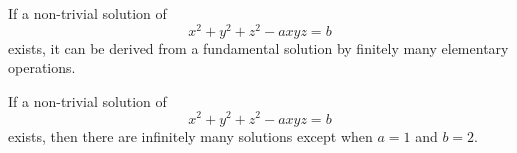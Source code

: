 \begin{proposition}
    If a non-trivial solution of
\[
    x^2+y^2+z^2-axyz=b
\]
    exists, it can be derived from a fundamental solution by finitely many elementary operations.
\end{proposition}

\begin{proposition}
    If a non-trivial solution of
\[
    x^2+y^2+z^2-axyz=b
\]
    exists, then there are infinitely many solutions except when $a=1$ and $b=2$.
\end{proposition}
